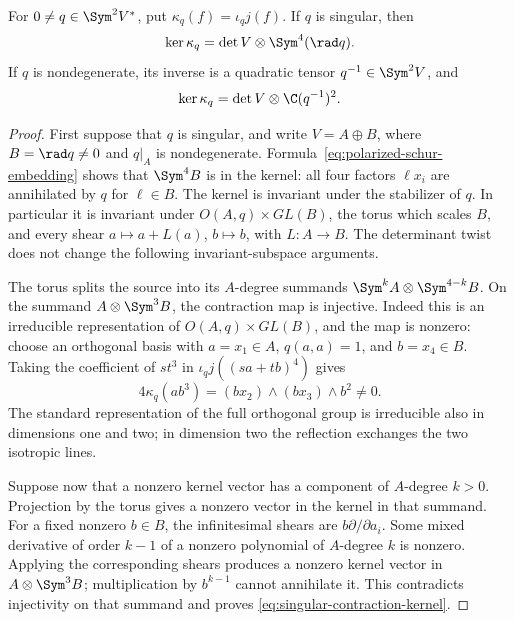 \begin{lemma}
\label{lem:schur-contraction-kernel}
For \(0\ne q\in\Sym^2V^*\), put
\(\kappa_q(f)=\iota_qj(f)\).  If \(q\) is singular, then
\begin{equation}\label{eq:singular-contraction-kernel}
 \ker\kappa_q=\det V\otimes\Sym^4(\rad q).
\end{equation}
If \(q\) is nondegenerate, its inverse is a quadratic tensor
\(q^{-1}\in\Sym^2V\), and
\begin{equation}\label{eq:nonsingular-contraction-kernel}
 \ker\kappa_q=\det V\otimes\C(q^{-1})^2.
\end{equation}
\end{lemma}
\begin{proof}
First suppose that \(q\) is singular, and write
\(V=A\oplus B\), where \(B=\rad q\ne0\) and \(q|_A\)
is nondegenerate.  Formula~\eqref{eq:polarized-schur-embedding}
shows that \(\Sym^4B\) is in the kernel: all four factors
\(\ell x_i\) are annihilated by \(q\) for \(\ell\in B\).
The kernel is invariant under the stabilizer of \(q\).  In
particular it is invariant under \(O(A,q)\times GL(B)\), the
torus which scales \(B\), and every shear
\(a\mapsto a+L(a)\), \(b\mapsto b\), with \(L:A\to B\).
The determinant twist does not change the following invariant-subspace
arguments.

The torus splits the source into its \(A\)-degree summands
\(\Sym^kA\otimes\Sym^{4-k}B\).  On the summand
\(A\otimes\Sym^3B\), the contraction map is injective.  Indeed
this is an irreducible representation of
\(O(A,q)\times GL(B)\), and the map is nonzero: choose an
orthogonal basis with \(a=x_1\in A\), \(q(a,a)=1\), and
\(b=x_4\in B\).  Taking the coefficient of \(st^3\) in
\(\iota_qj((sa+tb)^4)\) gives
\[
 4\kappa_q(ab^3)
       =(b x_2)\wedge(b x_3)\wedge b^2\ne0.
\]
The standard representation of the full orthogonal group is
irreducible also in dimensions one and two; in dimension two the
reflection exchanges the two isotropic lines.

Suppose now that a nonzero kernel vector has a component of
\(A\)-degree \(k>0\).  Projection by the torus gives a
nonzero vector in the kernel in that summand.  For a fixed nonzero
\(b\in B\), the infinitesimal shears are
\(b\partial/\partial a_i\).  Some mixed derivative of order
\(k-1\) of a nonzero polynomial of \(A\)-degree \(k\) is
nonzero.  Applying the corresponding shears produces a nonzero
kernel vector in \(A\otimes\Sym^3B\); multiplication by
\(b^{k-1}\) cannot annihilate it.  This contradicts injectivity
on that summand and proves
\eqref{eq:singular-contraction-kernel}.


\end{proof}
